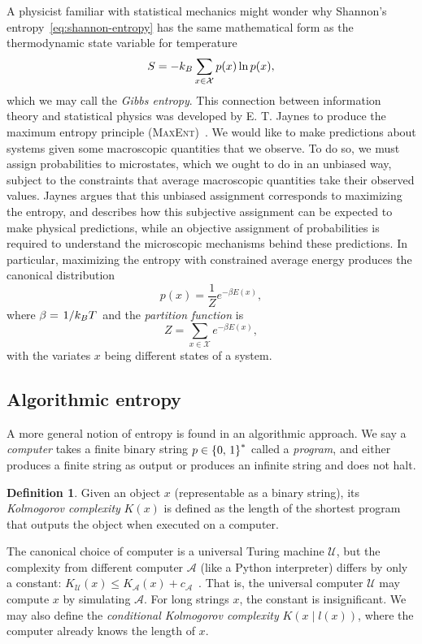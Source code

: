 \documentclass[aps,reprint,floatfix]{revtex4-2}
\renewcommand\mathrm\textnormal%
\theoremstyle{plain}
\theoremstyle{definition}
\newtheorem*{defn*}{Definition}
\renewcommand\leq\leqslant%
\renewcommand\ln{\operatorname{\mathrm{ln}}}
\begin{document}
A physicist familiar with statistical mechanics might wonder why Shannon's
entropy~\eqref{eq:shannon-entropy} has the same mathematical form as the
thermodynamic state variable for temperature
\begin{equation}
  S
  = -k_B \sum_{x \in \mathcal{X}} p(x) \ln p(x),
  \label{eq:gibbs-entropy}
\end{equation}
which we may call the \emph{Gibbs entropy}. This connection between information
theory and statistical physics was developed by E. T. Jaynes to produce the
maximum entropy principle (\textsc{MaxEnt})~\cite{jaynes1957information}. We
would like to make predictions about systems given some macroscopic quantities
that we observe. To do so, we must assign probabilities to microstates, which we
ought to do in an unbiased way, subject to the constraints that average
macroscopic quantities take their observed values. Jaynes argues that this
unbiased assignment corresponds to maximizing the entropy, and describes how
this subjective assignment can be expected to make physical predictions, while
an objective assignment of probabilities is required to understand the
microscopic mechanisms behind these predictions. In particular, maximizing the
entropy with constrained average energy produces the canonical
distribution~\cite{jaynes1957information}
\[
  p(x)
  = \frac{1}{Z}e^{-\beta E(x)},
\]
where $\beta = \flatfrac{1}{k_B T}$ and the \emph{partition function} is
\[
  Z
  = \sum_{x \in \mathcal{X}} e^{-\beta E(x)},
\]
with the variates $x$ being different states of a system.

\subsection{Algorithmic entropy}

A more general notion of entropy is found in an algorithmic approach. We say a
\emph{computer} takes a finite binary string $p \in \qty{0,\, 1}^*$ called a
\emph{program}, and either produces a finite string as output or produces an
infinite string and does not halt.
\begin{defn*}\label{def:kolmogorov}
  Given an object $x$ (representable as a binary string), its \emph{Kolmogorov
  complexity} $K(x)$ is defined as the length of the shortest program that
  outputs the object when executed on a computer.
\end{defn*}
The canonical choice of computer is a universal Turing machine $\mathcal{U}$,
but the complexity from different computer $\mathcal{A}$ (like a Python
interpreter) differs by only a constant: $K_{\mathcal{U}}(x) \leq
K_{\mathcal{A}}(x) + c_{\mathcal{A}}$~\cite[p.~467]{cover}. That is, the
universal computer $\mathcal{U}$ may compute $x$ by simulating $\mathcal{A}$.
For long strings $x$, the constant is insignificant. We may also define the
\emph{conditional Kolmogorov complexity} $K(x \mathbin{|} l(x))$, where the
computer already knows the length of $x$.
\end{document}
